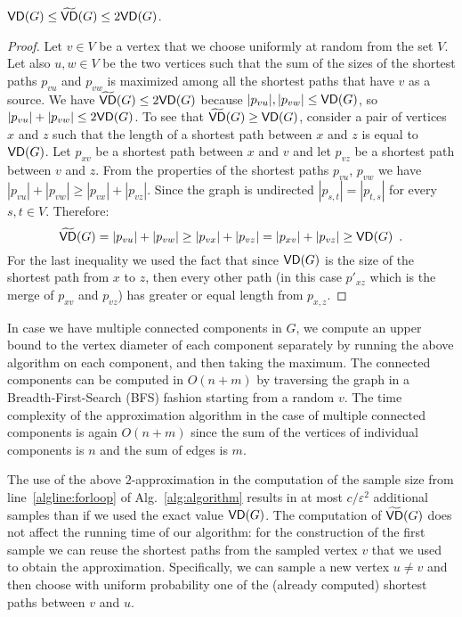 \begin{lemma}\label{lem:diam}
  $\mathsf{VD}(G)\le\widetilde{\mathsf{VD}}(G)\le 2\mathsf{VD}(G)$.
\end{lemma}
\begin{proof}
  Let $v\in V$ be a vertex that we choose uniformly at random from the set $V$.
  Let also $u,w\in V$ be the two vertices such that the sum of the sizes of the
  shortest paths $p_{vu}$ and $p_{vw}$ is maximized among all the shortest paths
  that have $v$ as a source.  We have $\widetilde{\mathsf{VD}}(G)\le 2\mathsf{VD}(G)$ because
  $|p_{vu}|,|p_{vw}|\le\mathsf{VD}(G)$, so $|p_{vu}|+|p_{vw}|\le 2\mathsf{VD}(G)$. To see
  that $\widetilde{\mathsf{VD}}(G)\ge\mathsf{VD}(G)$, consider a pair of vertices $x$ and $z$ such
  that the length of a shortest path between $x$ and $z$ is equal to $\mathsf{VD}(G)$.
  Let $p_{xv}$ be a shortest path between $x$ and $v$ and let $p_{vz}$ be a
  shortest path between $v$ and $z$. 
  From the properties of the shortest paths $p_{vu}$, $p_{vw}$ we have
  $|p_{vu}|+|p_{vw}|\geq |p_{vx}|+|p_{vz}|$. Since the graph is undirected
  $|p_{s,t}|=|p_{t,s}|$ for every $s,t\in V$.
  Therefore:
  \[
    \widetilde{\mathsf{VD}}(G) = |p_{vu}|+|p_{vw}|\geq |p_{vx}|+|p_{vz}| =
    |p_{xv}|+|p_{vz}|\ge\mathsf{VD}(G)\enspace. 
  \]
  For the last inequality we used the fact that since $\mathsf{VD}(G)$ is the size of
  the shortest path from $x$ to $z$, then every other path (in this case
  $p'_{xz}$ which is the merge of $p_{xv}$ and $p_{vz}$) has greater or equal
  length from $p_{x,z}$.
\end{proof}
In case we have multiple connected components in $G$, we compute an upper bound
to the vertex diameter of each component separately by running the above
algorithm on each component, and then taking the maximum. 
The connected components can be computed in $O(n+m)$ by traversing the graph in
a Breadth-First-Search (BFS) fashion starting from a random $v$.
The time complexity of the approximation algorithm in the case of multiple
connected components is again $O(n+m)$ since the sum of the vertices of
individual components is $n$ and the sum of edges is $m$. 

The use of the above $2$-approximation in the computation of the
sample size from line~\ref{algline:forloop} of Alg.~\ref{alg:algorithm} results
in at most $c/\varepsilon^2$ additional samples than if we
used the exact value $\mathsf{VD}(G)$. The computation of $\widetilde{\mathsf{VD}}(G)$
does not affect the running time of our algorithm: for the construction of
the first sample we can reuse the shortest paths from the sampled
vertex $v$ that we used to obtain the approximation. Specifically, we can sample
a new vertex $u\neq v$ and then choose with uniform probability one of the
(already computed) shortest paths between $v$ and $u$.

